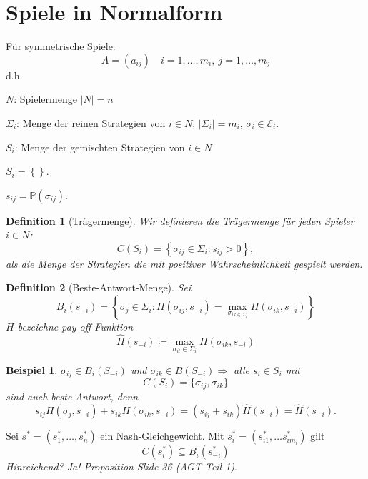 \documentclass[12pt]{extreport} %
\theoremstyle{named}
\theoremstyle{itshape}
\newtheorem*{definition}{Definition}
\theoremstyle{normal}
\newtheorem*{beispiel*}{Beispiel}
\begin{document}
  
\section{Spiele in Normalform}
Für symmetrische Spiele:
$$ A = \left( a_{ij} \right) \quad i = 1, \dotsc, m_{i}, ~ j = 1, \dotsc, m_{j} $$
d.h.
\begin{description}
	\item $N$: Spielermenge $|N| = n$
	\item $\Sigma_{i}$: Menge der reinen Strategien von $i \in N$, $\left| \Sigma_{i} \right| = m_{i}$, $\sigma_{i} \in \mathcal{E}_{i}$.
	\item $S_{i}$: Menge der gemischten Strategien von $i \in N$
		\begin{description}
			\item $S_{i} = \left\{ \right\}$.
			\item $s_{ij} = \mathds{P}(\sigma_{ij})$.
		\end{description}
\end{description}
  
\begin{definition}[Trägermenge] Wir definieren die Trägermenge für jeden Spieler $i \in N$:
	$$ C(S_{i}) = \left\{ \sigma_{ij} \in \Sigma_{i} : s_{ij} > 0 \right\}, $$
	als die Menge der Strategien die mit positiver Wahrscheinlichkeit gespielt werden.
\end{definition}  

\begin{definition}[Beste-Antwort-Menge] Sei
	$$ B_{i}(s_{-i}) = \left\{ \sigma_{j} \in \Sigma_{i} : H(\sigma_{ij}, s_{-i}) = \max_{\sigma_{ik \in \Sigma_{i}}} H(\sigma_{ik}, s_{-i}) \right\} $$ 
	$H$ bezeichne pay-off-Funktion ~\\
	$$ \hat{H}(s_{-i}) \coloneqq \max_{\sigma_{il} \in \Sigma_{i}} H(\sigma_{ik}, s_{-i}) $$
\end{definition}
  
  
\begin{beispiel*}
	$\sigma_{ij} \in B_{i}(S_{-i})$ und $\sigma_{ik} \in B(S_{-i}) \Rightarrow$ alle $s_{i} \in S_{i}$ mit
	$$ C(S_{i}) = \{ \sigma_{ij}, \sigma_{ik} \} $$	
	sind auch beste Antwort, denn
	$$ s_{ij} H(\sigma_{j}, s_{-i}) + s_{ik} H(\sigma_{ik}, s_{-i}) = (s_{ij} + s_{ik}) \hat{H}(s_{-i}) = \hat{H}(s_{-i}). $$
\end{beispiel*}

Sei $s^{*} = \left( s_{1}^{*}, \dotsc, s_{n}^{*} \right)$ ein Nash-Gleichgewicht. Mit $s_{i}^{*} = (s_{i1}^{*}, \dotsc s_{im_{i}}^{*})$ gilt
$$ C(s_{i}^{*}) \subseteq B_{i}(s_{-i}^{*}) $$
 \textit{Hinreichend? Ja! Proposition Slide 36 (AGT Teil 1)}.
\end{document}
